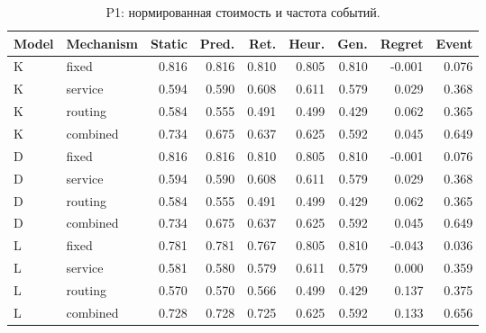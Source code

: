 \begin{table}[htbp]\caption{P1: нормированная стоимость и частота событий.}\centering\small\setlength{\tabcolsep}{3pt}

\begin{tabular}{llrrrrrrr}\toprule

Model & Mechanism & Static & Pred. & Ret. & Heur. & Gen. & Regret & Event\\\midrule

K & fixed & 0.816 & 0.816 & 0.810 & 0.805 & 0.810 & -0.001 & 0.076\\

K & service & 0.594 & 0.590 & 0.608 & 0.611 & 0.579 & 0.029 & 0.368\\

K & routing & 0.584 & 0.555 & 0.491 & 0.499 & 0.429 & 0.062 & 0.365\\

K & combined & 0.734 & 0.675 & 0.637 & 0.625 & 0.592 & 0.045 & 0.649\\

D & fixed & 0.816 & 0.816 & 0.810 & 0.805 & 0.810 & -0.001 & 0.076\\

D & service & 0.594 & 0.590 & 0.608 & 0.611 & 0.579 & 0.029 & 0.368\\

D & routing & 0.584 & 0.555 & 0.491 & 0.499 & 0.429 & 0.062 & 0.365\\

D & combined & 0.734 & 0.675 & 0.637 & 0.625 & 0.592 & 0.045 & 0.649\\

L & fixed & 0.781 & 0.781 & 0.767 & 0.805 & 0.810 & -0.043 & 0.036\\

L & service & 0.581 & 0.580 & 0.579 & 0.611 & 0.579 & 0.000 & 0.359\\

L & routing & 0.570 & 0.570 & 0.566 & 0.499 & 0.429 & 0.137 & 0.375\\

L & combined & 0.728 & 0.728 & 0.725 & 0.625 & 0.592 & 0.133 & 0.656\\

\bottomrule\end{tabular}\end{table}


